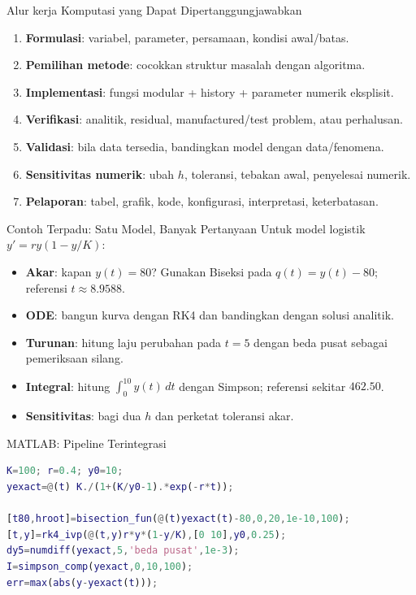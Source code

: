 \documentclass[slides,english,noindex,lean,nobackpage,nocopyright,noupdate,nosummary]{enacom}
\newcommand{\meth}[1]{\textbf{#1}}
\begin{document}
\begin{frame}{Alur kerja Komputasi yang Dapat Dipertanggungjawabkan}
\begin{enumerate}
\item \meth{Formulasi}: variabel, parameter, persamaan, kondisi awal/batas.
\item \meth{Pemilihan metode}: cocokkan struktur masalah dengan algoritma.
\item \meth{Implementasi}: fungsi modular + history + parameter numerik eksplisit.
\item \meth{Verifikasi}: analitik, residual, manufactured/test problem, atau perhalusan.
\item \meth{Validasi}: bila data tersedia, bandingkan model dengan data/fenomena.
\item \meth{Sensitivitas numerik}: ubah $h$, toleransi, tebakan awal, penyelesai numerik.
\item \meth{Pelaporan}: tabel, grafik, kode, konfigurasi, interpretasi, keterbatasan.
\end{enumerate}
\end{frame}

\begin{frame}{Contoh Terpadu: Satu Model, Banyak Pertanyaan}
Untuk model logistik $y'=ry(1-y/K)$:
\begin{itemize}
\item \meth{Akar}: kapan $y(t)=80$? Gunakan Biseksi pada $q(t)=y(t)-80$; referensi $t\approx8.9588$.
\item \meth{ODE}: bangun kurva dengan RK4 dan bandingkan dengan solusi analitik.
\item \meth{Turunan}: hitung laju perubahan pada $t=5$ dengan beda pusat sebagai pemeriksaan silang.
\item \meth{Integral}: hitung $\int_0^{10}y(t)\,dt$ dengan Simpson; referensi sekitar $462.50$.
\item \meth{Sensitivitas}: bagi dua $h$ dan perketat toleransi akar.
\end{itemize}
\end{frame}

\begin{frame}{MATLAB: Pipeline Terintegrasi}
\begin{lstlisting}[language=Matlab]
K=100; r=0.4; y0=10;
yexact=@(t) K./(1+(K/y0-1).*exp(-r*t));

[t80,hroot]=bisection_fun(@(t)yexact(t)-80,0,20,1e-10,100);
[t,y]=rk4_ivp(@(t,y)r*y*(1-y/K),[0 10],y0,0.25);
dy5=numdiff(yexact,5,'beda pusat',1e-3);
I=simpson_comp(yexact,0,10,100);
err=max(abs(y-yexact(t)));
\end{lstlisting}
\end{frame}
\end{document}
